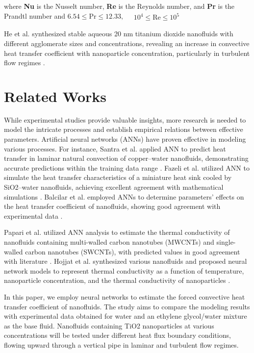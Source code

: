 \documentclass{article}
\begin{document}
where  \textbf{Nu} is the Nusselt number,  \textbf{Re}  is the Reynolds number, and  \textbf{Pr} is the Prandtl number and $ 6.54 \leq \text{Pr} \leq 12.33, \quad \begin{matrix}
10^4 \leq \text{Re} \leq 10^5
\end{matrix} $

He et al. synthesized stable aqueous 20 nm titanium dioxide nanofluids with different agglomerate sizes and concentrations, revealing an increase in convective heat transfer coefficient with nanoparticle concentration, particularly in turbulent flow regimes \cite{ref2}.


\section{Related Works}

While experimental studies provide valuable insights, more research is needed to model the intricate processes and establish empirical relations between effective parameters. Artificial neural networks (ANNs) have proven effective in modeling various processes. For instance, Santra et al. applied ANN to predict heat transfer in laminar natural convection of copper–water nanofluids, demonstrating accurate predictions within the training data range \cite{ref3}. Fazeli et al. utilized ANN to simulate the heat transfer characteristics of a miniature heat sink cooled by SiO2–water nanofluids, achieving excellent agreement with mathematical simulations \cite{ref4}. Balcilar et al. employed ANNs to determine parameters' effects on the heat transfer coefficient of nanofluids, showing good agreement with experimental data \cite{ref5}.

Papari et al. utilized ANN analysis to estimate the thermal conductivity of nanofluids containing multi-walled carbon nanotubes (MWCNTs) and single-walled carbon nanotubes (SWCNTs), with predicted values in good agreement with literature \cite{ref6}. Hojjat et al. synthesized various nanofluids and proposed neural network models to represent thermal conductivity as a function of temperature, nanoparticle concentration, and the thermal conductivity of nanoparticles \cite{ref7}.

In this paper, we employ neural networks to estimate the forced convective heat transfer coefficient of nanofluids. The study aims to compare the modeling results with experimental data obtained for water and an ethylene glycol/water mixture as the base fluid. Nanofluids containing TiO2 nanoparticles at various concentrations will be tested under different heat flux boundary conditions, flowing upward through a vertical pipe in laminar and turbulent flow regimes.
\end{document}
